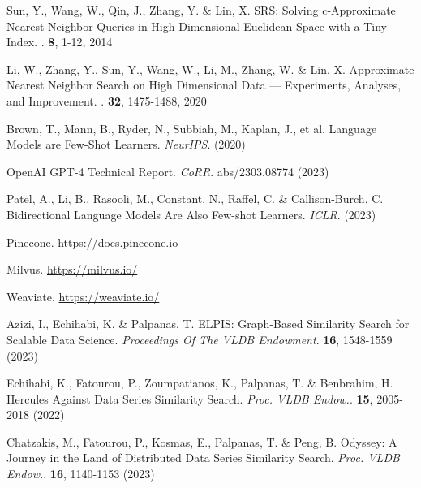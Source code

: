 \documentclass[11pt]{article}
\begin{document}
\begin{thebibliography}{10}
\begin{small}
Sun, Y., Wang, W., Qin, J., Zhang, Y. \& Lin, X. 
\newblock SRS: Solving c-Approximate Nearest Neighbor Queries in High Dimensional Euclidean Space with a Tiny Index. 
. \textbf{8}, 1-12, 2014

Li, W., Zhang, Y., Sun, Y., Wang, W., Li, M., Zhang, W. \& Lin, X. 
\newblock Approximate Nearest Neighbor Search on High Dimensional Data — Experiments, Analyses, and Improvement. 
. \textbf{32}, 1475-1488, 2020

Brown, T., Mann, B., Ryder, N., Subbiah, M., Kaplan, J., et al. Language Models are Few-Shot Learners. {\em NeurIPS}. (2020)

OpenAI GPT-4 Technical Report. {\em CoRR}. {abs/2303.08774} (2023)

Patel, A., Li, B., Rasooli, M., Constant, N., Raffel, C. \& Callison-Burch, C. Bidirectional Language Models Are Also Few-shot Learners. {\em ICLR}. (2023)

Pinecone.
\newblock \url{https://docs.pinecone.io}

Milvus.
\newblock \url{https://milvus.io/}


Weaviate.
\newblock \url{https://weaviate.io/}

Azizi, I., Echihabi, K. \& Palpanas, T. ELPIS: Graph-Based Similarity Search for Scalable Data Science. {\em Proceedings Of The VLDB Endowment}. \textbf{16}, 1548-1559 (2023)

Echihabi, K., Fatourou, P., Zoumpatianos, K., Palpanas, T. \& Benbrahim, H. Hercules Against Data Series Similarity Search. {\em Proc. VLDB Endow.}. \textbf{15}, 2005-2018 (2022)

Chatzakis, M., Fatourou, P., Kosmas, E., Palpanas, T. \& Peng, B. Odyssey: A Journey in the Land of Distributed Data Series Similarity Search. {\em Proc. VLDB Endow.}. \textbf{16}, 1140-1153 (2023)
\end{small}
\end{thebibliography}


%
%
%
% 
% 
\end{document}

